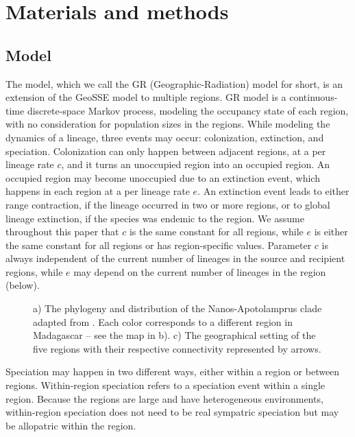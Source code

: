 \section*{Materials and methods}
\subsection*{Model}
\noindent The model, which we call the GR (Geographic-Radiation) model for short, is an extension of the GeoSSE model \citep{Goldberg2011} to multiple regions. 
GR model is a continuous-time discrete-space Markov process, modeling the occupancy state of each region, with no consideration for population sizes in the regions. 
While modeling the dynamics of a lineage, three events may occur: colonization, extinction, and speciation. 
Colonization can only happen between adjacent regions, at a per lineage rate $c$, and it turns an unoccupied region into an occupied region. 
An occupied region may become unoccupied due to an extinction event, which happens in each region at a per lineage rate $e$. 
An extinction event leads to either range contraction, if the lineage occurred in two or more regions, or to global lineage extinction, if the species was endemic to the region. 
We assume throughout this paper that $c$ is the same constant for all regions, while $e$ is either the same constant for all regions or has region-specific values. 
Parameter $c$ is always independent of the current number of lineages in the source and recipient regions, while $e$ may depend on the current number of lineages in the region (below).
%
\begin{figure*}[!t]
\begin{center}
\caption{a) The phylogeny and distribution of the Nanos-Apotolamprus clade adapted from \citet{Miraldo2014}. 
		Each color corresponds to a different region in Madagascar – see the map in b). 
		c) The geographical setting of the five regions with their respective connectivity represented by arrows.}
\label{fig:1}
\vspace{-0.3in}
\end{center}
\end{figure*}
%
Speciation may happen in two different ways, either within a region or between regions. 
Within-region speciation refers to a speciation event within a single region. 
Because the regions are large and have heterogeneous environments, within-region speciation does not need to be real sympatric speciation but may be allopatric within the region. 
